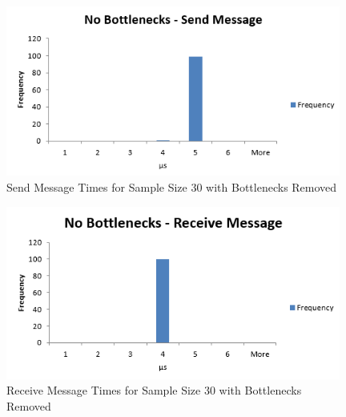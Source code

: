 \documentclass[se]{uw-wkrpt}
\begin{document}
\begin{figure}[bp!]
\centering
\includegraphics[width=110mm]{NB-SendMessageHistogram.png}
\caption{Send Message Times for Sample Size 30 with Bottlenecks Removed}
\label{fig:send-nobottlenecks}
\end{figure}

\begin{figure}[bp!]
\centering
\includegraphics[width=110mm]{NB-ReceiveMessageHistogram.png}
\caption{Receive Message Times for Sample Size 30 with Bottlenecks Removed}
\label{fig:receive-nobottlenecks}
\end{figure}
\end{document}
